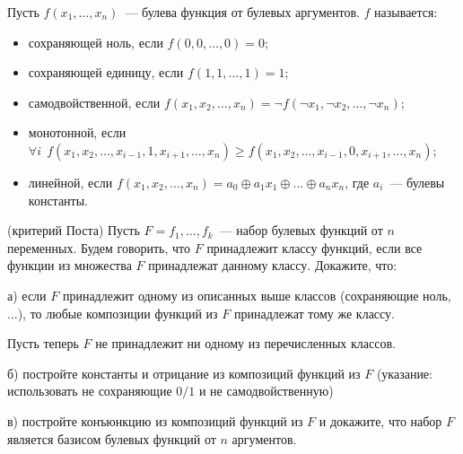 Пусть $f(x_1, \dots, x_n)$~--- булева функция от булевых аргументов.
$f$ называется:
\begin{itemize}
	\item сохраняющей ноль, если $f(0, 0, \dots, 0) = 0$;
	\item сохраняющей единицу, если $f(1, 1, \dots, 1) = 1$;
	\item самодвойственной, если $f(x_1, x_2, \dots, x_n) = \neg
		f(\neg x_1, \neg x_2, \dots, \neg x_n)$;
    \item монотонной, если
		$\forall i~~ f(x_1, x_2, \dots, x_{i - 1}, 1, x_{i + 1},
        \dots,  x_n) \ge f(x_1, x_2, \dots, x_{i - 1}, 0, x_{i + 1},
        \dots,  x_n)$;
    \item линейной, если $f(x_1, x_2, \dots, x_n) = a_0 \oplus a_1x_1
		\oplus \dots \oplus a_nx_n$, где $a_i$~--- булевы константы.
\end{itemize}

\begin{task} (критерий Поста)
	Пусть $F = {f_1, \dots, f_k}$~--- набор булевых функций от $n$
    переменных. Будем говорить, что $F$ принадлежит классу функций,
    если все функции из множества $F$ принадлежат данному классу.
    Докажите, что:

	а) если $F$ принадлежит одному из описанных выше классов
    (сохраняющие ноль, ...), то любые
    композиции функций из $F$ принадлежат тому же классу.
    
    Пусть теперь $F$ не принадлежит ни одному из перечисленных
    классов.
    
    б) постройте константы и отрицание из композиций функций из $F$
    (указание: использовать не сохраняющие $0/1$ и не самодвойственную)

    в) постройте конъюнкцию из композиций функций из $F$ и докажите,
    что набор $F$ является базисом булевых функций от $n$ аргументов.
\end{task}